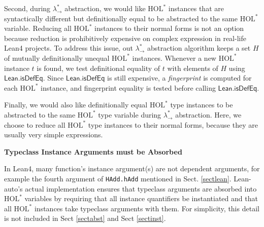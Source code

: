   Second, during $\lambda_\to^*$ abstraction, we would like $\text{HOL}^*$ instances
that are syntactically different but definitionally equal to be abstracted to the
same $\text{HOL}^*$ variable. Reducing all $\text{HOL}^*$ instances to their normal forms is
not an option because reduction is prohibitively expensive on complex
expression in real-life Lean4 projects. To address this issue, out $\lambda_\to^*$ abstraction algorithm keeps a
set $H$ of mutually definitionally unequal $\text{HOL}^*$ instances. Whenever a new $\text{HOL}^*$
instance $t$ is found, we test definitional equality of $t$ with elements of $H$
using $\mathsf{Lean.isDefEq}$. Since $\mathsf{Lean.isDefEq}$ is still expensive,
a \textit{fingerprint} is computed for each $\text{HOL}^*$ instance, and fingerprint equality
is tested before calling $\mathsf{Lean.isDefEq}$.

  Finally, we would also like definitionally equal $\text{HOL}^*$ type instances to
be abstracted to the same $\text{HOL}^*$ type variable during $\lambda_\to^*$ abstraction.
Here, we choose to reduce all $\text{HOL}^*$ type instances to their normal forms, because they
are usually very simple expressions.

\noindent \textbf{Typeclass Instance Arguments must be Absorbed}

  In Lean4, many function's instance argument(s) are not dependent arguments,
for example the fourth argument of \texttt{HAdd.hAdd} mentioned in Sect. \ref{sectlean}.
Lean-auto's actual implementation ensures that typeclass arguments are absorbed into
$\text{HOL}^*$ variables by requiring that all instance quantifiers be instantiated
and that all $\text{HOL}^*$ instances take typeclass arguments with them. For
simplicity, this detail is not included in Sect \ref{sectabst} and Sect \ref{sectinst}.